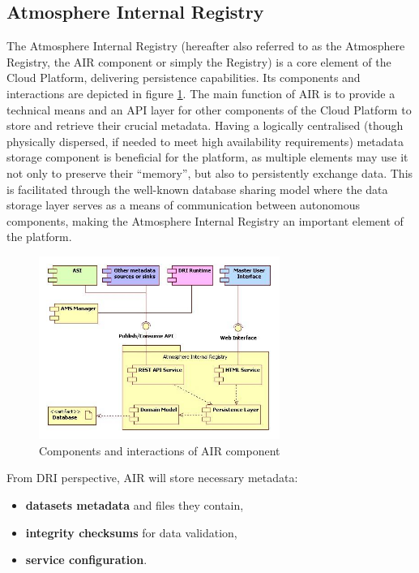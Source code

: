 \subsection{Atmosphere Internal Registry}
\label{air}
The Atmosphere Internal Registry (hereafter also referred to as the Atmosphere
Registry, the AIR component or simply the Registry) is a core element of the 
Cloud Platform, delivering persistence capabilities. Its components and
interactions are depicted in figure \ref{fig:air-architecture}. The main 
function of AIR is to provide a technical means and an API layer for other 
components of the Cloud Platform to store and retrieve their crucial metadata. Having 
a logically centralised (though physically dispersed, if needed to meet high
availability requirements) metadata storage component is beneficial for the 
platform, as multiple elements may use it not only to preserve their “memory”,
but also to persistently exchange data. 
This is facilitated through the well-known database sharing 
model where the data storage layer serves as a means of communication between
autonomous components, making the Atmosphere Internal Registry an important 
element of the platform.

\begin{figure}[h!]
	\centering
	\includegraphics[width=0.7\textwidth]{images/air-architecture.png}
	\caption{Components and interactions of AIR component}
	\label{fig:air-architecture}
\end{figure}

From DRI perspective, AIR will store necessary metadata:

\begin{itemize}
	\item \textbf{datasets metadata} and files they contain,
	\item \textbf{integrity checksums} for data validation,
	\item \textbf{service configuration}.
\end{itemize}

